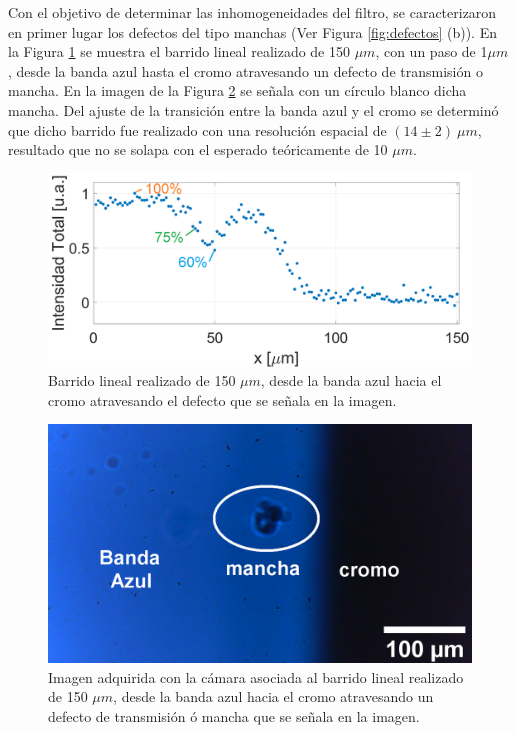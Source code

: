 Con el objetivo de determinar las inhomogeneidades del filtro, se caracterizaron en primer lugar los defectos del tipo manchas  (Ver Figura \ref{fig:defectos} (b)). En la Figura \ref{fig:barinted} se muestra el barrido lineal realizado de 150 $\mu m$, con un paso de 1$\mu m$, desde la banda azul hasta el cromo atravesando un defecto de transmisión o mancha. En la imagen de la Figura \ref{fig:batod} se señala con un círculo blanco dicha mancha. Del ajuste de la transición entre la banda azul y el cromo se determinó que dicho barrido fue realizado con una resolución espacial de $(14 \pm 2)~\mu m$, resultado que no se solapa con el esperado teóricamente de 10 $\mu m$.

 \begin{figure}[H]
	\centering
	\includegraphics[width=1.0\textwidth]{Figs/microespectrometro/barridolamancha.png}
	\caption{Barrido lineal realizado de 150 $\mu m$, desde la banda azul hacia el cromo atravesando el defecto que se señala en la imagen.}
	\label{fig:barinted}
\end{figure}

 \begin{figure}[H]
	\centering
	\includegraphics[scale=0.4]{Figs/microespectrometro/barridoenzdefecto.png}
	\caption{Imagen adquirida con la cámara asociada al barrido lineal realizado de 150 $\mu m$, desde la banda azul hacia el cromo atravesando un defecto de transmisión ó mancha que se señala en la imagen.}
	\label{fig:batod}
\end{figure}

